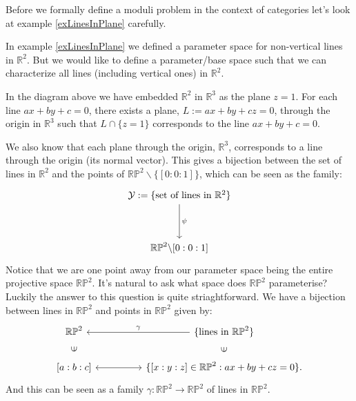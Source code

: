 Before we formally define a moduli problem in the context of categories let's look at example \ref{exLinesInPlane} carefully.
\begin{example}
    \label{compExLinesInplane}
    In example \ref{exLinesInPlane} we defined a parameter space for non-vertical lines in $\mathbb{R}^{2}$. 
    But we would like to define a parameter/base space such that we can characterize all lines (including vertical ones) in $\mathbb{R}^{2}$.
    \par In the diagram above we have embedded $\mathbb{R}^{2}$ in $\mathbb{R}^{3}$ as the plane $z = 1$.
    For each line $ax + by + c = 0 $, there exists a plane, $L := ax + by + cz = 0$,  through the origin in $\mathbb{R}^{3}$ such that $L \cap \{z=1\}$ corresponds to the line $ax + by + c = 0 $.
    \par We also know that each plane through the origin, $\mathbb{R}^{3}$, corresponds to a line through the origin (its normal vector). 
    This gives a bijection between the set of lines in $\mathbb{R}^{2}$ and the points of $\mathbb{RP}^{2}\backslash \{ [0:0:1]\}$, which can be seen as the family:
    \[
        \begin{tikzcd}
            \mathcal{Y} := \{\text{set of lines in } \mathbb{R}^{2}\}\\
            \\
            \mathbb{RP}^{2}\backslash {[0:0:1]}
            \arrow["\psi", from = 1-1, to = 3-1]
        \end{tikzcd}
    \]
    Notice that we are one point away from our parameter space being the entire projective space $\mathbb{RP}^{2}$.
    It's natural to ask what space does $\mathbb{RP}^{2}$ parameterise?
    Luckily the answer to this question is quite striaghtforward.
    We have a bijection between lines in $\mathbb{RP}^{2}$ and points in $\mathbb{RP}^{2}$ given by:
    \[
        \begin{tikzcd}
            {\mathbb{RP}^{2}} & & {\{\text{lines in }\mathbb{RP}^{2}\}} \\
            {[a:b:c]} \arrow[u, phantom, sloped, "\in"]& & {\{[x:y:z] \in \mathbb{RP}^{2}: ax + by + cz = 0 \}}\arrow[u, phantom, sloped, "\in"].
            \arrow["\gamma", leftarrow, from = 1-1, to = 1-3]
            \arrow[ leftrightarrow, from = 2-1, to = 2-3]
        \end{tikzcd}
    \]
    And this can be seen as a family $\gamma : \mathbb{RP}^{2}\to \mathbb{RP}^{2}$ of lines in $\mathbb{RP}^{2}$.

\end{example}
